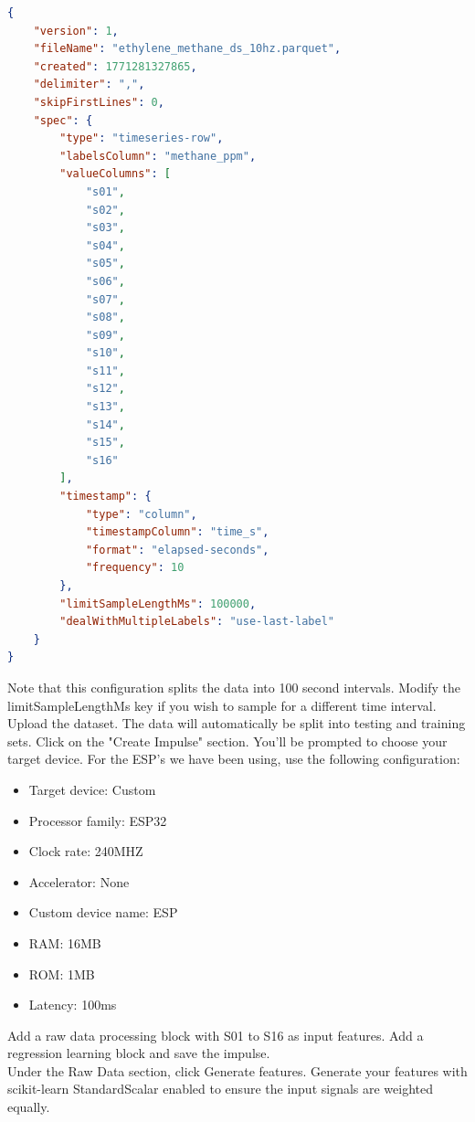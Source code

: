 \documentclass{article}
\begin{document}
\begin{lstlisting}[language=json,firstnumber=1]
{
    "version": 1,
    "fileName": "ethylene_methane_ds_10hz.parquet",
    "created": 1771281327865,
    "delimiter": ",",
    "skipFirstLines": 0,
    "spec": {
        "type": "timeseries-row",
        "labelsColumn": "methane_ppm",
        "valueColumns": [
            "s01",
            "s02",
            "s03",
            "s04",
            "s05",
            "s06",
            "s07",
            "s08",
            "s09",
            "s10",
            "s11",
            "s12",
            "s13",
            "s14",
            "s15",
            "s16"
        ],
        "timestamp": {
            "type": "column",
            "timestampColumn": "time_s",
            "format": "elapsed-seconds",
            "frequency": 10
        },
        "limitSampleLengthMs": 100000,
        "dealWithMultipleLabels": "use-last-label"
    }
}
\end{lstlisting}

Note that this configuration splits the data into 100 second intervals. Modify the limitSampleLengthMs key if you wish to sample for a different time interval.\\

Upload the dataset. The data will automatically be split into testing and training sets. Click on the "Create Impulse" section. You'll be prompted to choose your target device. For the ESP's we have been using, use the following configuration:

\begin{itemize}
    \item Target device: Custom
    \item Processor family: ESP32
    \item Clock rate: 240MHZ
    \item Accelerator: None
    \item Custom device name: ESP
    \item RAM: 16MB
    \item ROM: 1MB
    \item Latency: 100ms
\end{itemize}

Add a raw data processing block with S01 to S16 as input features. Add a regression learning block and save the impulse. \\

Under the Raw Data section, click Generate features. Generate your features with scikit-learn StandardScalar enabled to ensure the input signals are weighted equally.\\
\end{document}
